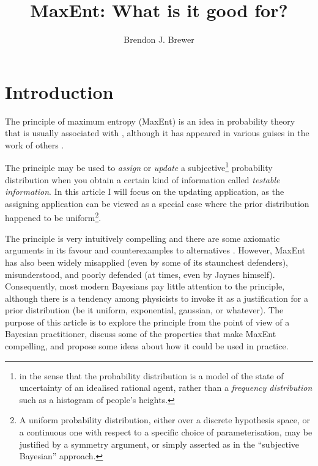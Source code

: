 \documentclass[a4paper, 11pt]{article}
\title{MaxEnt: What is it good for?}
\author{Brendon J. Brewer}
\begin{document}
\maketitle


\section{Introduction}
The principle of maximum entropy (MaxEnt) is an idea in probability theory
that is usually associated with \citet{jaynes}, although it has appeared in
various guises in the work of others \citep[e.g.][]{gibbs, boltzmann, shannon}.

The principle may be used
to {\it assign} or {\it update} a
subjective\footnote{in the sense that the probability distribution is a model
of the state of uncertainty of an idealised rational agent, rather than
a {\it frequency distribution} such as a histogram of people's heights.}
probability distribution when you obtain a certain kind of information
called {\it testable information}. In this article I will focus on the
updating application, as the assigning application can be viewed as a special
case where the prior distribution happened to be
uniform\footnote{A uniform probability distribution, either over a discrete
hypothesis space, or a continuous one with respect to a specific choice of
parameterisation, may be justified by a symmetry argument, or simply asserted
as in the ``subjective Bayesian'' approach.}.

The principle is very intuitively compelling
and there are some axiomatic arguments in its favour
\citep[e.g.][]{shore_johnson, 2006AIPC..872...31C, 2010arXiv1008.4831K}
and counterexamples to alternatives \citep[e.g.][]{presse}.
However, MaxEnt has also been widely
misapplied (even by some of its staunchest defenders), misunderstood,
and poorly defended (at times, even by Jaynes himself).
Consequently, most modern Bayesians pay little attention to the principle,
although there is a tendency among physicists to invoke it as a justification
for a prior distribution (be it uniform, exponential, gaussian, or whatever).
The purpose of this article is to explore the principle from the point of
view of a Bayesian practitioner, discuss some of the properties that
make MaxEnt compelling, and propose some ideas about how it could be used in
practice.
\end{document}

